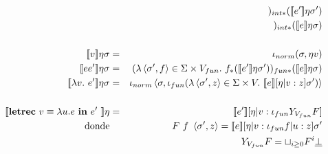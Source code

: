 \begin{eqnarray*}
        && \qquad )_{int*}(\se{e'}\eta\s') \\
        && )_{int*}(\se{e}\eta\s) \\ \\
      \se{v}\eta\s &=& \iota_{norm}(\s, \eta v) \\
      \se{ee'}\eta\s &=& (\lambda \la \s',f\ra \in \Sigma \times V_{fun}.\ f_* (\se{e'}\eta\s'))_{fun*}(\se{e}\eta\s) \\
      \se{\lambda v.\  e'}\eta\s &=&  \iota_{norm}\la \s, \iota_{fun}(\lambda \la\s',z\ra \in \Sigma \times V.\ \se{e}[\eta|v:z]\s')\ra \\ \\
      \se{\letrecin{v \equiv \lambda u.e}{e'}}\eta &=& \se{e'} [\eta |v:\iota_{fun} Y_{V_{fun}} F] \\
      \text{donde} && F\ f \ \la\s',z\ra = \se{e}[\eta|v:\iota_{fun} f|u:z]\s' \\
      && Y_{V_{fun}} F = \sqcup_{i \geq 0} F^{i} \underline{\bot}
    \end{eqnarray*}